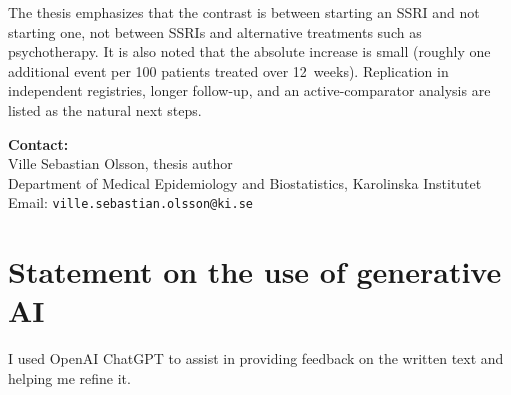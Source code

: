 \documentclass[11pt,a4paper]{article}
\begin{document}
The thesis emphasizes that the contrast is between starting an SSRI and not
starting one, not between SSRIs and alternative treatments such as
psychotherapy. It is also noted that the absolute increase is small (roughly one
additional event per 100 patients treated over 12~weeks). Replication
in independent registries, longer follow-up, and an active-comparator
analysis are listed as the natural next steps.

\medskip

\noindent\textbf{Contact:}\\
Ville Sebastian Olsson, thesis author\\
Department of Medical Epidemiology and Biostatistics, Karolinska Institutet\\
Email: \texttt{ville.sebastian.olsson@ki.se}\\

\section*{Statement on the use of generative AI}
I used OpenAI ChatGPT to assist in providing feedback on the written text and
helping me refine it.
\end{document}
